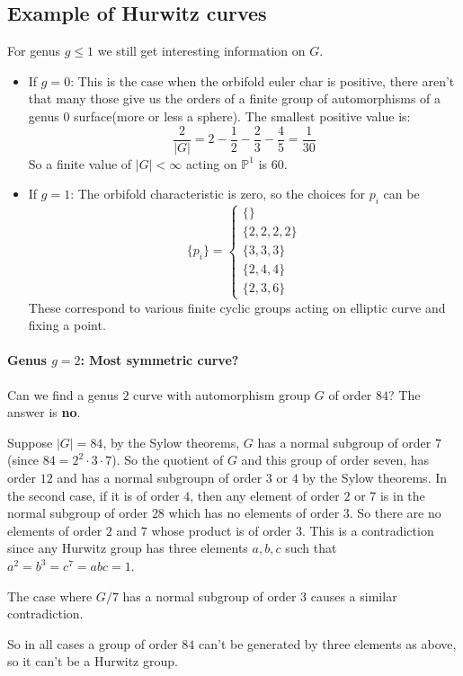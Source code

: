 \subsection{Example of Hurwitz curves}
For genus $g\leq 1$ we still get interesting information on $G$. \begin{itemize}
    \item If $g=0$: This is the case when the orbifold euler char is positive, there aren't that many those give us the orders of a finite group of automorphisms of a genus $0$ surface(more or less a sphere). The smallest positive value is:\[\frac{2}{|G|} = 2-\frac{1}{2}-\frac{2}{3}-\frac{4}{5} = \frac{1}{30}\] So a finite value of $|G|<\infty$ acting on $\mathbb{P}^1$ is $60$.
    \item If $g=1$: The orbifold characteristic is zero, so the choices for $p_i$ can be \[\{p_i\} = \begin{cases}
        \{\}\\
        \{2,2,2,2\}\\
        \{3,3,3\}\\
        \{2,4,4\}\\
        \{2,3,6\}
    \end{cases}\] These correspond to various finite cyclic groups acting on elliptic curve and fixing a point.
\end{itemize}

\paragraph*{Genus $g=2$: Most symmetric curve?}
Can we find a genus $2$ curve with automorphism group $G$ of order $84$? The answer is \textbf{no}.

Suppose $|G| = 84$, by the Sylow theorems, $G$ has a normal subgroup of order $7$ (since $84 = 2^2\cdot 3\cdot 7$). So the quotient of $G$ and this group of order seven, has order $12$ and has a normal subgroupn of order $3$ or $4$ by the Sylow theorems. In the second case, if it is of order $4$, then any element of order $2$ or $7$ is in the normal subgroup of order $28$ which has no elements of order $3$. So there are no elements of order $2$ and $7$ whose product is of order $3$.
This is a contradiction since any Hurwitz group has three elements $a,b,c$ such that $a^2=b^3=c^7=abc=1$.

The case where $G/7$ has a normal subgroup of order $3$ causes a similar contradiction.

So in all cases a group of order $84$ can't be generated by three elements as above, so it can't be a Hurwitz group.

